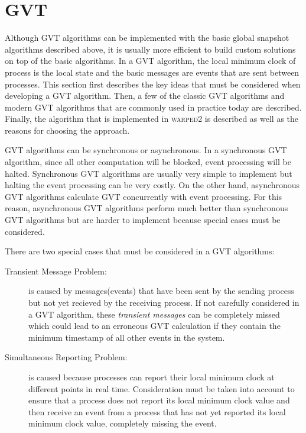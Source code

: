 \documentclass[11pt]{book}
\begin{document}
\section{GVT}

Although GVT algorithms can be implemented with the basic global snapshot algorithms described
above, it is usually more efficient to build custom solutions on top of the basic algorithms.
In a GVT algorithm, the local minimum clock of process is the local state and the basic
messages are events that are sent between processes. This section first describes the key
ideas that must be considered when developing a GVT algorithm. Then, a few of the classic
GVT algorithms and modern GVT algorithms that are commonly used in practice today are described.
Finally, the algorithm that is implemented in \textsc{warped2} is described as well as the
reasons for choosing the approach.

GVT algorithms can be synchronous or asynchronous. In a synchronous GVT algorithm, since
all other computation will be blocked, event processing will be halted. Synchronous GVT
algorithms are usually very simple to implement but halting the event processing can
be very costly. On the other hand, asynchronous GVT algorithms calculate GVT concurrently
with event processing. For this reason, asynchronous GVT algorithms perform much better
than synchronous GVT algorithms but are harder to implement because special cases must be
considered.

There are two special cases that must be considered in a GVT algorithms:

\begin{description}
    \item[Transient Message Problem:] is caused by messages(events) that have been sent by
    the sending process but not yet recieved by the receiving process. If not carefully
    considered in a GVT algorithm, these \emph{transient messages} can be completely missed
    which could lead to an erroneous GVT calculation if they contain the minimum timestamp
    of all other events in the system.
    \item[Simultaneous Reporting Problem:] is caused because processes can report their local
    minimum clock at different points in real time. Consideration must be taken into account
    to ensure that a process does not report its local minimum clock value and then receive
    an event from a process that has not yet reported its local minimum clock value,
    completely missing the event.
\end{description}
\end{document}

